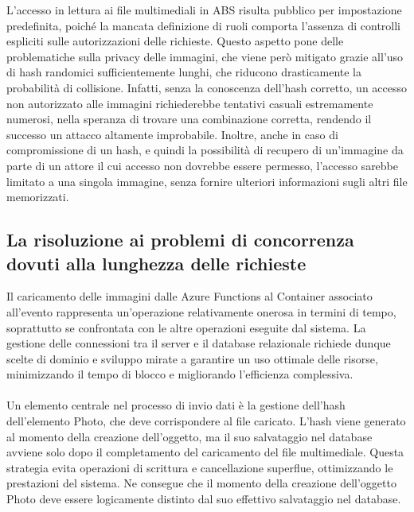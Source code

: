 L'accesso in lettura ai file multimediali in ABS risulta pubblico per impostazione predefinita, 
poiché la mancata definizione di ruoli comporta l'assenza di controlli espliciti sulle autorizzazioni delle richieste. 
Questo aspetto pone delle problematiche sulla privacy delle immagini, 
che viene però mitigato grazie all'uso di hash randomici sufficientemente lunghi, 
che riducono drasticamente la probabilità di collisione. 
Infatti, senza la conoscenza dell'hash corretto, 
un accesso non autorizzato alle immagini 
richiederebbe tentativi casuali estremamente numerosi,
nella speranza di trovare una combinazione corretta, 
rendendo il successo un attacco altamente improbabile. 
Inoltre, anche in caso di compromissione di un hash, 
e quindi la possibilità di recupero di un'immagine da parte di un attore 
il cui accesso non dovrebbe essere permesso,
l'accesso sarebbe limitato a una singola immagine, 
senza fornire ulteriori informazioni sugli altri file memorizzati.
\clearpage

\subsection{La risoluzione ai problemi di concorrenza dovuti alla lunghezza delle richieste}

Il caricamento delle immagini dalle Azure Functions al Container associato all’evento rappresenta un'operazione relativamente onerosa in termini di tempo, 
soprattutto se confrontata con le altre operazioni eseguite dal sistema. 
La gestione delle connessioni tra il server e il database relazionale richiede dunque scelte di dominio e sviluppo mirate a garantire un uso ottimale delle risorse, 
minimizzando il tempo di blocco e migliorando l'efficienza complessiva.\\
\\
Un elemento centrale nel processo di invio dati è la gestione dell’hash dell’elemento Photo, che deve corrispondere al file caricato. 
L’hash viene generato al momento della creazione dell’oggetto, ma il suo salvataggio nel database avviene solo dopo il completamento del caricamento del file multimediale. 
Questa strategia evita operazioni di scrittura e cancellazione superflue, ottimizzando le prestazioni del sistema. 
Ne consegue che il momento della creazione dell’oggetto Photo deve essere logicamente distinto dal suo effettivo salvataggio nel database.

